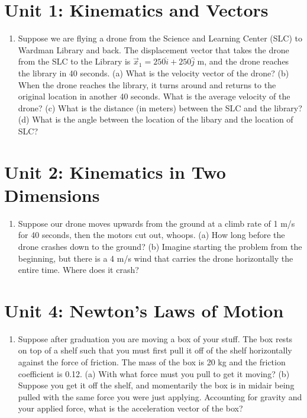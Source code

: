 \documentclass[10pt]{article}
\begin{document}
\section{Unit 1: Kinematics and Vectors}
\begin{enumerate}
\item Suppose we are flying a drone from the Science and Learning Center (SLC) to Wardman Library and back.  The displacement vector that takes the drone from the SLC to the Library is $\vec{x}_1 = 250 \hat{i} + 250 \hat{j}$ m, and the drone reaches the library in 40 seconds.  (a) What is the velocity vector of the drone? (b) When the drone reaches the library, it turns around and returns to the original location in another 40 seconds.  What is the average velocity of the drone? (c) What is the distance (in meters) between the SLC and the library?  (d) What is the angle between the location of the libary and the location of SLC? \\ \vspace{3cm}
\end{enumerate}

\section{Unit 2: Kinematics in Two Dimensions}
\begin{enumerate}
\item Suppose our drone moves upwards from the ground at a climb rate of 1 m/s for 40 seconds, then the motors cut out, whoops.  (a) How long before the drone crashes down to the ground?  (b) Imagine starting the problem from the beginning, but there is a 4 m/s wind that carries the drone horizontally the entire time.  Where does it crash? \\ \vspace{2.5cm}
\end{enumerate}

\section{Unit 4: Newton's Laws of Motion}
\begin{enumerate}
\item Suppose after graduation you are moving a box of your stuff.  The box rests on top of a shelf such that you must first pull it off of the shelf horizontally against the force of friction.  The mass of the box is 20 kg and the friction coefficient is 0.12.  (a) With what force must you pull to get it moving?  (b) Suppose you get it off the shelf, and momentarily the box is in midair being pulled with the same force you were just applying.  Accounting for gravity and your applied force, what is the acceleration vector of the box? \\ \vspace{3cm}
\end{enumerate}
\end{document}

